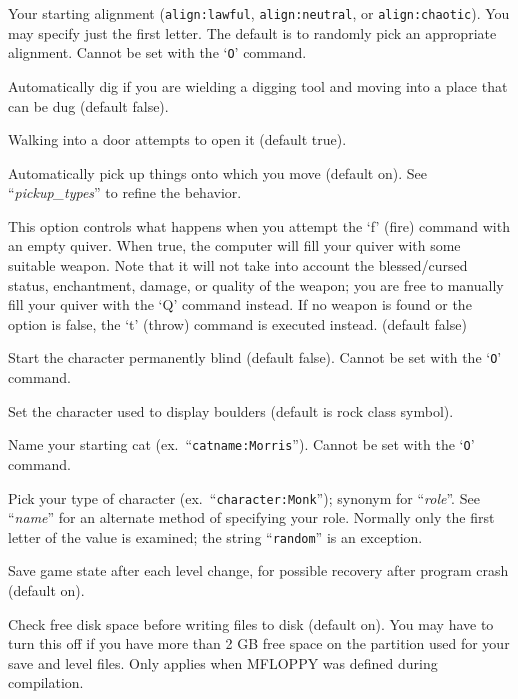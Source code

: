 \blist{}
\item[\ib{align}]
Your starting alignment ({\tt align:lawful}, {\tt align:neutral},
or {\tt align:chaotic}).  You may specify just the first letter.
The default is to randomly pick an appropriate alignment.
Cannot be set with the `{\tt O}' command.
\item[\ib{autodig}]
Automatically dig if you are wielding a digging tool and moving into a place
that can be dug (default false).
\item[\ib{autoopen}]
Walking into a door attempts to open it (default true).
\item[\ib{autopickup}]
Automatically pick up things onto which you move (default on).
See ``{\it pickup\_types\/}'' to refine the behavior.
\item[\ib{autoquiver}]
This option controls what happens when you attempt the `f' (fire)
command with an empty quiver.  When true, the computer will fill
your quiver with some suitable weapon.  Note that it will not take
into account the blessed/cursed status, enchantment, damage, or
quality of the weapon; you are free to manually fill your quiver with
the `Q' command instead.  If no weapon is found or the option is
false, the `t' (throw) command is executed instead.  (default false)
\item[\ib{blind}]
Start the character permanently blind (default false).  Cannot be set
with the `{\tt O}' command.
\item[\ib{boulder}]
Set the character used to display boulders (default is rock class symbol).
\item[\ib{catname}]
Name your starting cat (ex.\ ``{\tt catname:Morris}'').
Cannot be set with the `{\tt O}' command.
\item[\ib{character}]
Pick your type of character (ex.\ ``{\tt character:Monk}'');
synonym for ``{\it role\/}''.  See ``{\it name\/}'' for an alternate method
of specifying your role.  Normally only the first letter of
the value is examined; the string ``{\tt random}'' is an exception.
\item[\ib{checkpoint}]
Save game state after each level change, for possible recovery after
program crash (default on).
\item[\ib{checkspace}]
Check free disk space before writing files to disk (default on).
You may have to turn this off if you have more than 2 GB free space
on the partition used for your save and level files.
Only applies when MFLOPPY was defined during compilation.
